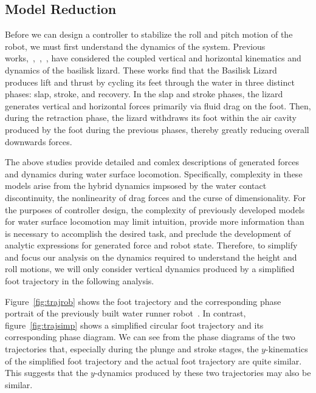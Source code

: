 \subsection{Model Reduction}

Before we can design a controller to stabilize the roll and pitch motion of the robot, we must first understand the dynamics of the system. Previous works,~\cite{glasheen1996hydrodynamic},~\cite{floyd2008design},~\cite{hsieh2004running}, have considered the coupled vertical and horizontal kinematics and dynamics of the basilisk lizard. These works find that the Basilisk Lizard produces lift and thrust by cycling its feet through the water in three distinct phases: slap, stroke, and recovery. In the slap and stroke phases, the lizard generates vertical and horizontal forces primarily via fluid drag on the foot. Then, during the retraction phase, the lizard withdraws its foot within the air cavity produced by the foot during the previous phases, thereby greatly reducing overall downwards forces. 

The above studies provide detailed and comlex descriptions of generated forces and dynamics during water surface locomotion. Specifically, complexity in these models arise from the hybrid dynamics impsosed by the water contact discontinuity, the nonlinearity of drag forces and the curse of dimensionality. For the purposes of controller design, the complexity of previously developed models for water surface locomotion may limit intuition, provide more information than is necessary to accomplish the desired task, and preclude the development of analytic expressions for generated force and robot state. Therefore, to simplify and focus our analysis on the dynamics required to understand the height and roll motions, we will only consider vertical dynamics produced by a simplified foot trajectory in the following analysis. 

Figure~\ref{fig:trajrob} shows the foot trajectory  and the corresponding phase portrait of the previously built water runner robot~\cite{park2010roll}. In contrast, figure~\ref{fig:trajsimp} shows a simplified circular foot trajectory and its corresponding phase diagram. We can see from the phase diagrams of the two trajectories that, especially during the plunge and stroke stages, the $y$-kinematics of the simplified foot trajectory and the actual foot trajectory are quite similar. This suggests that the $y$-dynamics produced by these two trajectories may also be similar.

